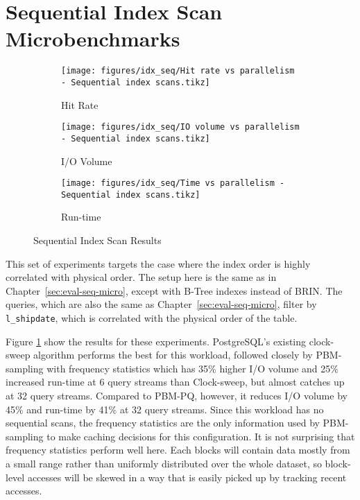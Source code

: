 \section{Sequential Index Scan Microbenchmarks}


\begin{figure}
\centering
    \begin{subfigure}{0.45\textwidth}
        \centering
        \texttt{[image: figures/idx\_seq/Hit rate vs parallelism - Sequential index scans.tikz]}
        \caption{Hit Rate}
    \end{subfigure}\hspace{0.05\textwidth}%
    \begin{subfigure}{0.45\textwidth}
        \centering
        \texttt{[image: figures/idx\_seq/IO volume vs parallelism - Sequential index scans.tikz]}
        \caption{I/O Volume}
    \end{subfigure}
    
\vspace{20pt}
    \begin{subfigure}{0.45\textwidth}
        \centering
        \texttt{[image: figures/idx\_seq/Time vs parallelism - Sequential index scans.tikz]}
        \caption{Run-time}
    \end{subfigure}

    \caption{Sequential Index Scan Results}
    \label{fig:idx_seq}
\end{figure}

This set of experiments targets the case where the index order is highly correlated with physical order. The setup here is the same as in Chapter~\ref{sec:eval-seq-micro}, except with B-Tree indexes instead of BRIN. The queries, which are also the same as Chapter~\ref{sec:eval-seq-micro}, filter by \verb|l_shipdate|, which is correlated with the physical order of the table. %

Figure \ref{fig:idx_seq} show the results for these experiments. PostgreSQL's existing clock-sweep algorithm performs the best for this workload, followed closely by PBM-sampling with frequency statistics which has 35\% higher I/O volume and 25\% increased run-time at 6 query streams than Clock-sweep, but almost catches up at 32 query streams. Compared to PBM-PQ, however, it reduces I/O volume by 45\% and run-time by 41\% at 32 query streams. Since this workload has no sequential scans, the frequency statistics are the only information used by PBM-sampling to make caching decisions for this configuration. It is not surprising that frequency statistics perform well here. Each blocks will contain data mostly from a small range rather than uniformly distributed over the whole dataset, so block-level accesses will be skewed in a way that is easily picked up by tracking recent accesses.

